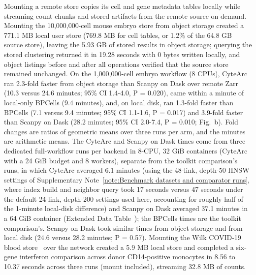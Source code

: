 \label{note:Overlay mounts and remote benchmarks}

Mounting a remote store copies its cell and gene metadata tables locally while streaming count chunks and stored artifacts from the remote source on demand. Mounting the 10,000,000-cell mouse embryo store from object storage created a 771.1 MB local user store (769.8 MB for cell tables, or 1.2\% of the 64.8 GB source store), leaving the 5.93 GB of stored results in object storage; querying the stored clustering returned it in 19.28 seconds with 0 bytes written locally, and object listings before and after all operations verified that the source store remained unchanged. On the 1,000,000-cell embryo workflow (8 CPUs), CyteArc ran 2.3-fold faster from object storage than Scanpy on Dask over remote Zarr (10.3 versus 24.6 minutes; 95\% CI 1.4-4.0, P = 0.020), came within a minute of local-only BPCells (9.4 minutes), and, on local disk, ran 1.3-fold faster than BPCells (7.1 versus 9.4 minutes; 95\% CI 1.1-1.6, P = 0.017) and 3.9-fold faster than Scanpy on Dask (28.2 minutes; 95\% CI 2.0-7.4, P = 0.010; Fig.~b). Fold changes are ratios of geometric means over three runs per arm, and the minutes are arithmetic means. The CyteArc and Scanpy on Dask times come from three dedicated full-workflow runs per backend in 8-CPU, 32 GiB containers (CyteArc with a 24 GiB budget and 8 workers), separate from the toolkit comparison's runs, in which CyteArc averaged 6.1 minutes (using the 48-link, depth-50 HNSW settings of Supplementary Note~\ref{note:Benchmark datasets and comparator runs}, where index build and neighbor query took 17 seconds versus 47 seconds under the default 24-link, depth-200 settings used here, accounting for roughly half of the 1-minute local-disk difference) and Scanpy on Dask averaged 37.1 minutes in a 64 GiB container (Extended Data Table~); the BPCells times are the toolkit comparison's. Scanpy on Dask took similar times from object storage and from local disk (24.6 versus 28.2 minutes; P = 0.57). Mounting the Wilk COVID-19 blood store~\cite{wilk2020singlecell} over the network created a 5.9 MB local store and completed a six-gene interferon comparison across donor CD14-positive monocytes in 8.56 to 10.37 seconds across three runs (mount included), streaming 32.8 MB of counts.

\label{note:CyteBase release and remote queries}

